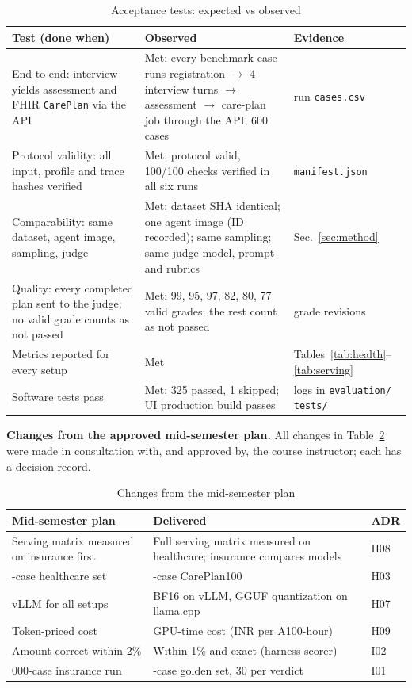 \documentclass[conference]{IEEEtran}
\begin{document}
\begin{table}[t]
\caption{Acceptance tests: expected vs observed}
\label{tab:accept}
\centering\scriptsize
\begin{tabularx}{\columnwidth}{@{}>{\raggedright\arraybackslash}p{2.0cm}>{\raggedright\arraybackslash}X>{\raggedright\arraybackslash}p{1.75cm}@{}}
\toprule
Test (done when) & Observed & Evidence \\
\midrule
End to end: interview yields assessment and FHIR \texttt{CarePlan} via the API & Met: every benchmark case runs registration $\rightarrow$ 4 interview turns $\rightarrow$ assessment $\rightarrow$ care-plan job through the API; 600 cases & run \texttt{cases.csv} \\
Protocol validity: all input, profile and trace hashes verified & Met: protocol valid, 100/100 checks verified in all six runs & \texttt{manifest.json} \\
Comparability: same dataset, agent image, sampling, judge & Met: dataset SHA identical; one agent image (ID recorded); same sampling; same judge model, prompt and rubrics & Sec.~\ref{sec:method} \\
Quality: every completed plan sent to the judge; no valid grade counts as not passed & Met: 99, 95, 97, 82, 80, 77 valid grades; the rest count as not passed & grade revisions \\
Metrics reported for every setup & Met & Tables~\ref{tab:health}--\ref{tab:serving} \\
Software tests pass & Met: 325 passed, 1 skipped; UI production build passes & logs in \texttt{evaluation/} \texttt{tests/} \\
\bottomrule
\end{tabularx}
\end{table}

\textbf{Changes from the approved mid-semester plan.} All changes in Table~\ref{tab:plan} were made in consultation with, and approved by, the course instructor; each has a decision record.

\begin{table}[t]
\caption{Changes from the mid-semester plan}
\label{tab:plan}
\centering\scriptsize
\begin{tabularx}{\columnwidth}{@{}>{\raggedright\arraybackslash}p{2.0cm}>{\raggedright\arraybackslash}X>{\raggedright\arraybackslash}p{0.75cm}@{}}
\toprule
Mid-semester plan & Delivered & ADR \\
\midrule
Serving matrix measured on insurance first & Full serving matrix measured on healthcare; insurance compares models & H08 \\
30-case healthcare set & 100-case CarePlan100 & H03 \\
vLLM for all setups & BF16 on vLLM, GGUF quantization on llama.cpp & H07 \\
Token-priced cost & GPU-time cost (INR per A100-hour) & H09 \\
Amount correct within 2\% & Within 1\% and exact (harness scorer) & I02 \\
1{,}000-case insurance run & 120-case golden set, 30 per verdict & I01 \\
\bottomrule
\end{tabularx}
\end{table}
\end{document}
